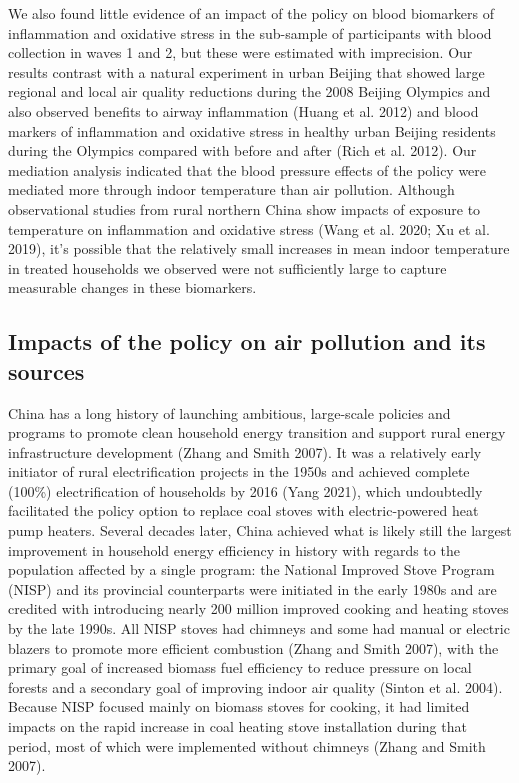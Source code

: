 \documentclass[
  letterpaper,
  DIV=11,
  numbers=noendperiod]{scrartcl}
\begin{document}
We also found little evidence of an impact of the policy on blood
biomarkers of inflammation and oxidative stress in the sub-sample of
participants with blood collection in waves 1 and 2, but these were
estimated with imprecision. Our results contrast with a natural
experiment in urban Beijing that showed large regional and local air
quality reductions during the 2008 Beijing Olympics and also observed
benefits to airway inflammation (Huang et al. 2012) and blood markers of
inflammation and oxidative stress in healthy urban Beijing residents
during the Olympics compared with before and after (Rich et al. 2012).
Our mediation analysis indicated that the blood pressure effects of the
policy were mediated more through indoor temperature than air pollution.
Although observational studies from rural northern China show impacts of
exposure to temperature on inflammation and oxidative stress (Wang et
al. 2020; Xu et al. 2019), it's possible that the relatively small
increases in mean indoor temperature in treated households we observed
were not sufficiently large to capture measurable changes in these
biomarkers.

\hypertarget{impacts-of-the-policy-on-air-pollution-and-its-sources}{%
\subsection{Impacts of the policy on air pollution and its
sources}\label{impacts-of-the-policy-on-air-pollution-and-its-sources}}

China has a long history of launching ambitious, large-scale policies
and programs to promote clean household energy transition and support
rural energy infrastructure development (Zhang and Smith 2007). It was a
relatively early initiator of rural electrification projects in the
1950s and achieved complete (100\%) electrification of households by
2016 (Yang 2021), which undoubtedly facilitated the policy option to
replace coal stoves with electric-powered heat pump heaters. Several
decades later, China achieved what is likely still the largest
improvement in household energy efficiency in history with regards to
the population affected by a single program: the National Improved Stove
Program (NISP) and its provincial counterparts were initiated in the
early 1980s and are credited with introducing nearly 200 million
improved cooking and heating stoves by the late 1990s. All NISP stoves
had chimneys and some had manual or electric blazers to promote more
efficient combustion (Zhang and Smith 2007), with the primary goal of
increased biomass fuel efficiency to reduce pressure on local forests
and a secondary goal of improving indoor air quality (Sinton et al.
2004). Because NISP focused mainly on biomass stoves for cooking, it had
limited impacts on the rapid increase in coal heating stove installation
during that period, most of which were implemented without chimneys
(Zhang and Smith 2007).
\end{document}
